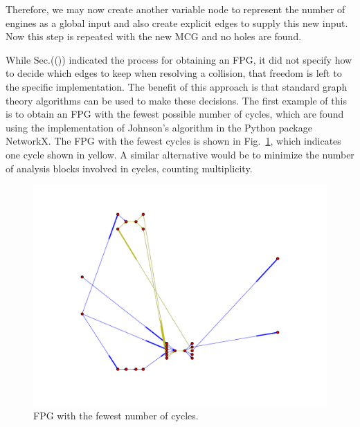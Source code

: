 Therefore, we may now create another variable node to represent the number of engines as a global input and also create explicit edges to supply this new input. Now this step is repeated with the new MCG and no holes are found.

While Sec.(()) indicated the process for obtaining an FPG, it did not specify how to decide which edges to keep when resolving a collision, that freedom is left to the specific implementation. The benefit of this approach is that standard graph theory algorithms can be used to make these decisions. The first example of this is to obtain an FPG with the fewest possible number of cycles, which are found using the implementation of Johnson's algorithm \cite{Johnson1975} in the Python package NetworkX. The FPG with the fewest cycles is shown in Fig.~\ref{f:FPG fewest cycles}, which indicates one cycle shown in yellow. A similar alternative would be to minimize the number of analysis blocks involved in cycles, counting multiplicity.
\begin{figure}[htb!]
  \begin{center}
    \includegraphics[width=.6\textwidth]{images/FPG_fewest_cycles}
  \end{center}
  \caption{FPG with the fewest number of cycles.}
\label{f:FPG fewest cycles}
\end{figure}

